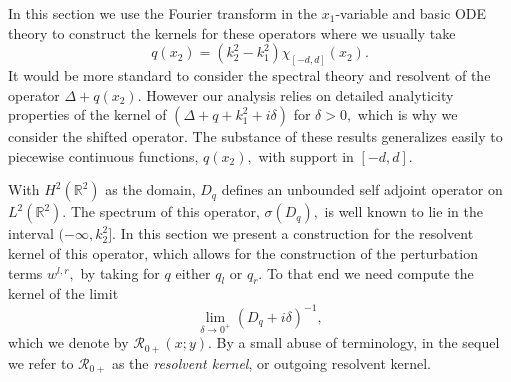\documentclass[11pt]{article}
\newcommand\cR{\mathcal R}
\newcommand\bbR{\mathbb R}
\theoremstyle{definition}
\theoremstyle{remark}
\begin{document}
  In this section we use the Fourier transform in the $x_1$-variable and basic ODE theory to construct
  the kernels for these operators   where we usually take
  \begin{equation}\label{eqn172.40}
  q(x_2)=(k_2^2-k_1^2)\chi_{[-d,d]}(x_2).
  \end{equation}  
 It would be more standard to consider the spectral theory and
 resolvent of the operator $\Delta+q(x_2).$ However our analysis
 relies on detailed analyticity properties of the kernel of
 $(\Delta+q+k_1^2+i\delta)$ for $\delta>0,$ which is why we consider
 the shifted operator. The substance of these results generalizes
 easily to piecewise continuous functions, $q(x_2),$ with support in
 $[-d,d].$

With $H^2(\bbR^2)$ as the domain, $D_q$ defines an unbounded self
adjoint operator on $L^2(\bbR^2).$ The spectrum of this operator,
$\sigma(D_{q}),$ is well known to lie in the interval
$(-\infty,k_2^2].$ In this section we present a construction for the resolvent
    kernel of this operator, which allows for the construction of the
    perturbation terms $w^{l,r},$ by taking for $q$ either $q_l$ or
    $q_r.$ To that end we need compute the kernel of the limit
    $$\lim_{\delta\to 0^+}(D_{q}+i\delta)^{-1},$$
which we denote by $\cR_{0+}(x;y).$ By a small abuse of terminology, in the
    sequel we refer to $\cR_{0+}$ as the \emph{resolvent kernel}, or outgoing
    resolvent kernel.
\end{document}
